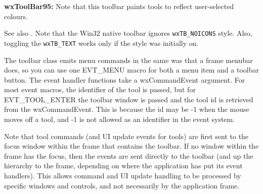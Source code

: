 {\bf wxToolBar95:} Note that this toolbar paints tools to reflect user-selected colours.


\twocolwidtha{5cm}
\begin{twocollist}\itemsep=0pt
\end{twocollist}

See also . Note that the Win32
native toolbar ignores {\tt wxTB\_NOICONS} style. Also, toggling the 
{\tt wxTB\_TEXT} works only if the style was initially on.


The toolbar class emits menu commands in the same was that a frame menubar does,
so you can use one EVT\_MENU macro for both a menu item and a toolbar button.
The event handler functions take a wxCommandEvent argument. For most event macros,
the identifier of the tool is passed, but for EVT\_TOOL\_ENTER the toolbar
window is passed and the tool id is retrieved from the wxCommandEvent.
This is because the id may be -1 when the mouse moves off a tool, and -1 is not
allowed as an identifier in the event system.

Note that tool commands (and UI update events for tools) are first sent to
the focus window within the frame that contains the toolbar. If no window within the frame has the focus,
then the events are sent directly to the toolbar (and up the hierarchy to the
frame, depending on where the application has put its event handlers). This allows command and UI update
handling to be processed by specific windows and controls, and not necessarily
by the application frame.

